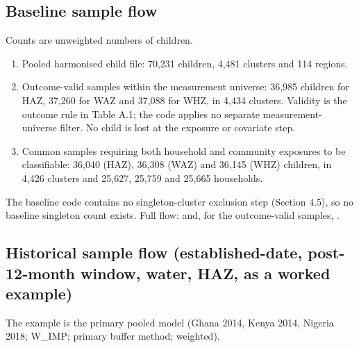 \subsection{Baseline sample flow}\label{sec:A.2}

Counts are unweighted numbers of children.

\begin{enumerate}
\def\labelenumi{\arabic{enumi}.}
\tightlist
\item
  Pooled harmonised child file: 70,231 children, 4,481 clusters and 114 regions.
\item
  Outcome-valid samples within the measurement universe: 36,985 children for HAZ, 37,260 for WAZ and 37,088 for WHZ, in 4,434 clusters. Validity is the outcome rule in Table A.1; the code applies no separate measurement-universe filter. No child is lost at the exposure or covariate step.
\item
  Common samples requiring both household and community exposures to be classifiable: 36,040 (HAZ), 36,308 (WAZ) and 36,145 (WHZ) children, in 4,426 clusters and 25,627, 25,759 and 25,665 households.
\end{enumerate}

The baseline code contains no singleton-cluster exclusion step (Section 4.5), so no baseline singleton count exists. Full flow:  and, for the outcome-valid samples, .

\subsection{Historical sample flow (established-date, post-12-month window, water, HAZ, as a worked example)}\label{sec:A.3}

The example is the primary pooled model (Ghana 2014, Kenya 2014, Nigeria 2018; W\_IMP; primary buffer method; weighted).

